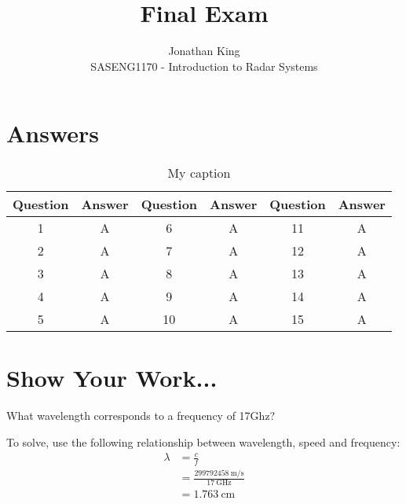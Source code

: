 \documentclass[12pt]{article}
\newenvironment{exercise}[2][Exercise]{\begin{trivlist}
    \item[\hskip \labelsep {\bfseries #1}\hskip \labelsep {\bfseries #2.}]}{\end{trivlist}}
\begin{document}
      
       
      
        
	\title{Final Exam} 
	\author{Jonathan King\\ %
	SASENG1170 - Introduction to Radar Systems} %
	 
	 \maketitle

   \section{Answers}
   \begin{table}[h]
     \centering
     \caption{My caption}
     \label{my-label}
     \begin{tabular}{|c|c|c|c|c|c|}
      \hline
      \rowcolor[HTML]{9B9B9B} 
      Question & Answer & Question & Answer & Question & Answer \\ \hline
      1        & A      & 6        & A      & 11       & A      \\ \hline
      2        & A      & 7        & A      & 12       & A      \\ \hline
      3        & A      & 8        & A      & 13       & A      \\ \hline
      4        & A      & 9        & A      & 14       & A      \\ \hline
      5        & A      & 10       & A      & 15       & A      \\ \hline
     \end{tabular}
    \end{table}

    \section{Show Your Work...}

      \begin{exercise}{1}
      What wavelength corresponds to a frequency of 17Ghz?
      
      To solve, use the following relationship between wavelength, speed and frequency:
      \begin{align*}
      \lambda & = \frac{c}{f} \\
      & = \frac{\SI{299792458}{\meter\per\second}}{\SI{17}{\GHz}}\\
      & = \SI{1.763}{\cm}
      \end{align*}
      
      \end{exercise}
      
\end{document}
